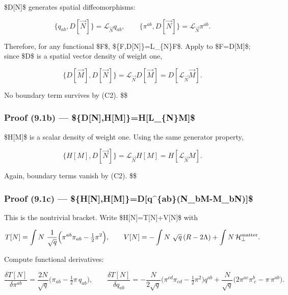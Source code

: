 \documentclass[
]{article}
\numberwithin{equation}{section}
\begin{document}
\$D{[}\vec N{]}\$ generates spatial diffeomorphisms:

\[
\{q_{ab},D[\vec N]\}=\mathcal L_{\vec N}q_{ab},\qquad \{\pi^{ab},D[\vec N]\}=\mathcal L_{\vec N}\pi^{ab}.
\]

Therefore, for any functional \$F\$,
\$\{F,D{[}\vec N{]}\}=\mathcal L\_\{\vec N\}F\$. Apply to
\$F=D{[}\vec M{]}\$; since \$D\$ is a spatial vector density of weight
one,

\[
\{D[\vec M],D[\vec N]\}=\mathcal L_{\vec N}D[\vec M]=D[\mathcal L_{\vec N}\vec M].
\]

No boundary term survives by (C2). \$\square\$

\hypertarget{proof-9.1b-dnhmhl_nm}{%
\subsubsection{\texorpdfstring{Proof (9.1b) ---
\$\{D{[}\vec N{]},H{[}M{]}\}=H{[}\mathcal L\_\{\vec N\}M{]}\$}{Proof (9.1b) --- \$\{D{[}N{]},H{[}M{]}\}=H{[}L\_\{N\}M{]}\$}}\label{proof-9.1b-dnhmhl_nm}}

\$H{[}M{]}\$ is a scalar density of weight one. Using the same generator
property,

\[
\{H[M],D[\vec N]\}=\mathcal L_{\vec N}H[M]=H[\mathcal L_{\vec N}M].
\]

Again, boundary terms vanish by (C2). \$\square\$

\hypertarget{proof-9.1c-hnhmdqabn_bm-m_bn}{%
\subsubsection{\texorpdfstring{Proof (9.1c) ---
\$\{H{[}N{]},H{[}M{]}\}=D{[}q\^{}\{ab\}(N\partial\_bM-M\partial\_bN){]}\$}{Proof (9.1c) --- \$\{H{[}N{]},H{[}M{]}\}=D{[}q\^{}\{ab\}(N\_bM-M\_bN){]}\$}}\label{proof-9.1c-hnhmdqabn_bm-m_bn}}

This is the nontrivial bracket. Write \$H{[}N{]}=T{[}N{]}+V{[}N{]}\$
with

\[
T[N]=\int N\ \frac{1}{\sqrt q}\Big(\pi^{ab}\pi_{ab}-\tfrac12\pi^2\Big),\qquad
V[N]=-\int N\ \sqrt q\,(R-2\Lambda)+\int N\,\mathcal H_\perp^{\rm matter}.
\]

Compute functional derivatives:

\[
\frac{\delta T[N]}{\delta \pi^{ab}}=\frac{2N}{\sqrt q}\Big(\pi_{ab}-\tfrac12\pi\,q_{ab}\Big),\qquad
\frac{\delta T[N]}{\delta q_{ab}}=-\frac{N}{2\sqrt q}\Big(\pi^{cd}\pi_{cd}-\tfrac12\pi^2\Big)q^{ab}+\frac{N}{\sqrt q}\big(2\pi^{ac}\pi^b_{\ c}-\pi\,\pi^{ab}\big).
\]
\end{document}
